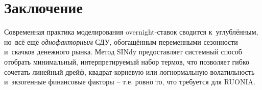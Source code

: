 \section{Заключение}
Современная практика моделирования
overnight-ставок сводится к углублённым,
но всё ещё \emph{однофакторным} СДУ,
обогащённым переменными сезонности
и скачков денежного рынка.  
Метод SINdy предоставляет системный способ
отобрать минимальный, интерпретируемый набор
термов, что позволяет гибко сочетать
линейный дрейф, квадрат-корневую
или логнормальную волатильность и экзогенные
финансовые факторы -- т.е. ровно то,
что требуется для RUONIA.